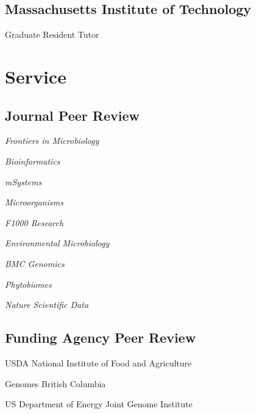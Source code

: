\documentclass[12pt,letterpaper]{report}
\newcommand{\listitemspace}{0.15em}
\renewenvironment{itemize}
{\begin{list}{}{\setlength{\leftmargin}{0em}
            \setlength{\parskip}{0em}
            \setlength{\itemsep}{\listitemspace}
            \setlength{\parsep}{\listitemspace}}}
    {\end{list}}
\begin{document}
    \subsection*{Massachusetts Institute of Technology}
            \begin{itemize}
    	\item Graduate Resident Tutor
	\end{itemize}


    \section*{Service}

    \subsection*{Journal Peer Review}

    \begin{itemize}
        
        \item \textit{Frontiers in Microbiology}
        \item \textit{Bioinformatics}
        \item \textit{mSystems}
         \item \textit{Microorganisms}
        \item \textit{F1000 Research}
        \item \textit{Environmental Microbiology}
        \item \textit{BMC Genomics}
        \item \textit{Phytobiomes}
        \item \textit{Nature Scientific Data}


    \end{itemize}


    \subsection*{Funding Agency Peer Review}

    \begin{itemize}

        \item USDA National Institute of Food and Agriculture

        \item Genomes British Columbia
        
        \item US Department of Energy Joint Genome Institute

    \end{itemize}
\end{document}
